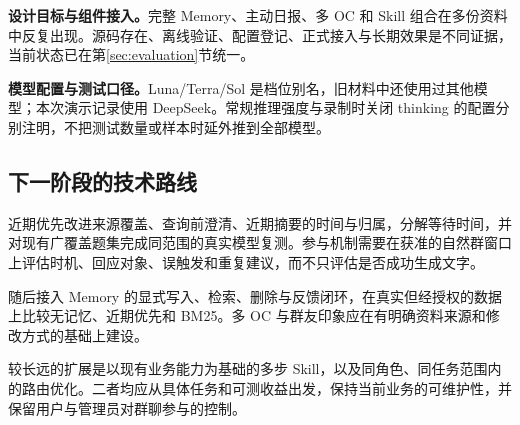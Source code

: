 \textbf{设计目标与组件接入。}完整 Memory、主动日报、多 OC 和 Skill 组合在多份资料中反复出现。源码存在、离线验证、配置登记、正式接入与长期效果是不同证据，当前状态已在第\ref{sec:evaluation}节统一。

\textbf{模型配置与测试口径。}Luna/Terra/Sol 是档位别名，旧材料中还使用过其他模型；本次演示记录使用 DeepSeek。常规推理强度与录制时关闭 thinking 的配置分别注明，不把测试数量或样本时延外推到全部模型。

\subsection{下一阶段的技术路线}
近期优先改进来源覆盖、查询前澄清、近期摘要的时间与归属，分解等待时间，并对现有广覆盖题集完成同范围的真实模型复测。参与机制需要在获准的自然群窗口上评估时机、回应对象、误触发和重复建议，而不只评估是否成功生成文字。

随后接入 Memory 的显式写入、检索、删除与反馈闭环，在真实但经授权的数据上比较无记忆、近期优先和 BM25。多 OC 与群友印象应在有明确资料来源和修改方式的基础上建设。

较长远的扩展是以现有业务能力为基础的多步 Skill，以及同角色、同任务范围内的路由优化。二者均应从具体任务和可测收益出发，保持当前业务的可维护性，并保留用户与管理员对群聊参与的控制。
